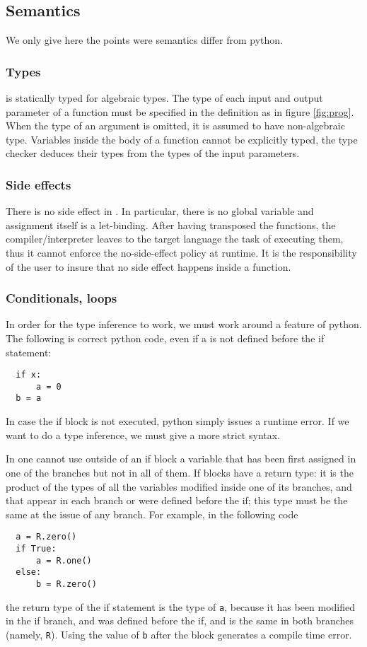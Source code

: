 \subsection{Semantics}
We only give here the points were \tALpy{} semantics differ from
python.

\subsubsection{Types}
\tALpy{} is statically typed for algebraic types. The type of each
input and output parameter of a function must be specified in the
definition as in figure \ref{fig:prog}. When the type of an argument
is omitted, it is assumed to have non-algebraic type. Variables inside
the body of a function cannot be explicitly typed, the type checker
deduces their types from the types of the input parameters.

\subsubsection{Side effects}
There is no side effect in \tALpy{}. In particular, there is no global
variable and assignment itself is a let-binding. After having
transposed the functions, the \tALpy{} compiler/interpreter leaves to
the target language the task of executing them, thus it cannot enforce
the no-side-effect policy at runtime. It is the responsibility of the
user to insure that no side effect happens inside a \tALpy{} function.

\subsubsection{Conditionals, loops}
\label{sec:conditionals-loops}
In order for the type inference to work, we must work around a feature
of python. The following is correct python code, even if a is not
defined before the if statement:
\begin{lstlisting}
  if x:
      a = 0
  b = a
\end{lstlisting}
In case the if block is not executed, python simply issues a runtime
error. If we want to do a type inference, we must give a more strict
syntax.

In \tALpy{} one cannot use outside of an if block a variable that has
been first assigned in one of the branches but not in all of them.  If
blocks have a return type: it is the product of the types of all the
variables modified inside one of its branches, and that appear in each
branch or were defined before the if; this type must be the same at
the issue of any branch. For example, in the following code
\begin{lstlisting}
  a = R.zero()
  if True:
      a = R.one()
  else:
      b = R.zero()
\end{lstlisting}
the return type of the if statement is the type of \lstinline{a},
because it has been modified in the if branch, and was defined before
the if, and is the same in both branches (namely,
\lstinline{R}). Using the value of \lstinline{b} after the block
generates a compile time error.

